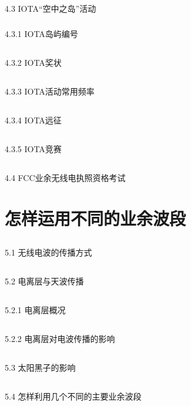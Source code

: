 \documentclass[12pt,UTF8]{ctexbook}
\begin{document}
\section{}4.3 IOTA“空中之岛”活动
\subsection{}4.3.1 IOTA岛屿编号
\section{}4.3.2 IOTA奖状
\section{}4.3.3 IOTA活动常用频率
\section{}4.3.4 IOTA远征
\section{}4.3.5 IOTA竞赛
\section{}4.4 FCC业余无线电执照资格考试

\chapter{怎样运用不同的业余波段}

\section{}5.1 无线电波的传播方式
\section{}5.2 电离层与天波传播
\section{}5.2.1 电离层概况
\section{}5.2.2 电离层对电波传播的影响
\section{}5.3 太阳黑子的影响
\section{}5.4 怎样利用几个不同的主要业余波段
\end{document}
